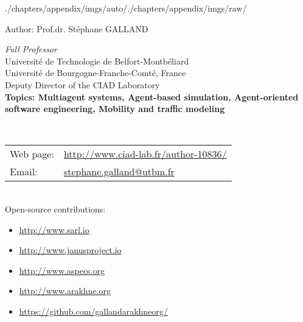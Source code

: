 \begin{graphicspathcontext}{{./chapters/appendix/imgs/auto/}{./chapters/appendix/imgs/raw/}}
\begin{frame}{{Author:} Prof\string.dr\string. St\'ephane GALLAND}
	\begin{minipage}[t]{.75\linewidth}
		\begin{raggedright}
			\textit{Full Professor} \\[.5cm]
			{\scriptsize
				Universit\'e de Technologie de Belfort-Montb\'eliard\\
				Universit\'e de Bourgogne-Franche-Comt\'e, France \\
				Deputy Director of the CIAD Laboratory} \\[.25cm]
			\textbf{Topics: Multiagent systems, Agent-based simulation, Agent-oriented software engineering, Mobility and traffic modeling} \\[.5cm]
		\end{raggedright}
	\end{minipage}%
	\hfill%
	 \\[.5cm]%
	\begin{raggedright}
		\scriptsize \begin{tabularx}{\linewidth}{@{}lX@{}}
			Web page: & \url{http://www.ciad-lab.fr/author-10836/} \\
			Email: & \href{mailto:stephane.galland@utbm.fr}{stephane.galland@utbm.fr} \\
		\end{tabularx} \\[.5cm]
		\scriptsize Open-source contributions:\begin{itemize}\tiny
			\item \url{http://www.sarl.io}
			\item \url{http://www.janusproject.io}
			\item \url{http://www.aspecs.org}
			\item \url{http://www.arakhne.org}
			\item \url{https://github.com/gallandarakhneorg/}
		\end{itemize}
	\end{raggedright}
\end{frame}


\end{graphicspathcontext}

